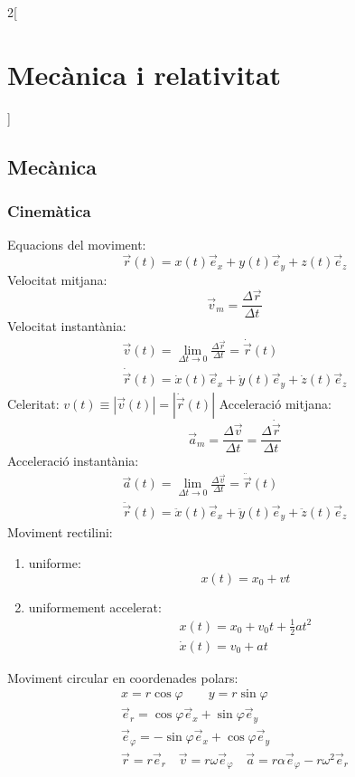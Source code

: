 \documentclass[class=article,10pt,crop=false]{standalone}
\begin{document}
\begin{multicols}{2}[\section{Mecànica i relativitat}]
\subsection{Mecànica}
\subsubsection{Cinemàtica}
Equacions del moviment: $$\Vec{r}(t)=x(t)\Vec{e}_x+y(t)\Vec{e}_y+z(t)\Vec{e}_z$$
Velocitat mitjana: $$\Vec{v}_m=\frac{\Delta\Vec{r}}{\Delta t}$$
Velocitat instantània:
\begin{gather*}
    \Vec{v}(t)=\lim_{\Delta t\to 0}\frac{\Delta\Vec{r}}{\Delta t}=\dot{\Vec{r}}(t)\\
    \dot{\Vec{r}}(t)=\dot{x}(t)\Vec{e}_x+\dot{y}(t)\Vec{e}_y+\dot{z}(t)\Vec{e}_z
\end{gather*}
Celeritat: $v(t)\equiv|\Vec{v}(t)|=|\dot{\Vec{r}}(t)|$\newline
Acceleració mitjana: $$\Vec{a}_m=\frac{\Delta\Vec{v}}{\Delta t}=\frac{\Delta\dot{\Vec{r}}}{\Delta t}$$
Acceleració instantània: 
\begin{gather*}
    \Vec{a}(t)=\lim_{\Delta t\to 0}\frac{\Delta\Vec{v}}{\Delta t}=\ddot{\Vec{r}}(t)\\
    \ddot{\Vec{r}}(t)=\ddot{x}(t)\Vec{e}_x+\ddot{y}(t)\Vec{e}_y+\ddot{z}(t)\Vec{e}_z
\end{gather*}
Moviment rectilini:
\begin{enumerate}
    \item uniforme:
    $$x(t)=x_0+vt$$
    \item uniformement accelerat:
    \begin{gather*}
        x(t)=x_0+v_0t+\frac{1}{2}at^2\\
        \dot{x}(t)=v_0+at
    \end{gather*}
\end{enumerate}
Moviment circular en coordenades polars:
\begin{gather*}
    x=r\cos\varphi\qquad y=r\sin \varphi\\
    \Vec{e}_r=\cos\varphi\Vec{e}_x+\sin\varphi\Vec{e}_y\\
    \Vec{e}_\varphi=-\sin\varphi\Vec{e}_x+\cos\varphi\Vec{e}_y\\
    \Vec{r}=r\Vec{e}_r\quad\Vec{v}=r\omega\Vec{e}_\varphi\quad\Vec{a}=r\alpha\Vec{e}_\varphi-r\omega^2\Vec{e}_r

\end{gather*}
\end{multicols}
\end{document}
